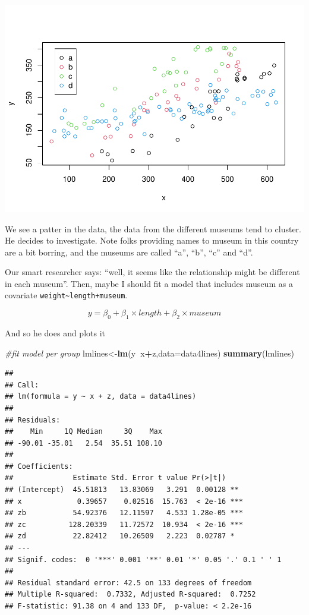 \documentclass[
]{book}
\newenvironment{Shaded}{\begin{snugshade}}{\end{snugshade}}
\newcommand{\CommentTok}[1]{\textcolor[rgb]{0.56,0.35,0.01}{\textit{#1}}}
\newcommand{\DataTypeTok}[1]{\textcolor[rgb]{0.13,0.29,0.53}{#1}}
\newcommand{\KeywordTok}[1]{\textcolor[rgb]{0.13,0.29,0.53}{\textbf{#1}}}
\newcommand{\NormalTok}[1]{#1}
\newcommand{\OperatorTok}[1]{\textcolor[rgb]{0.81,0.36,0.00}{\textbf{#1}}}
\begin{document}
\includegraphics{ECOMODbook_files/figure-latex/a7.11-1.pdf}

We see a patter in the data, the data from the different museums tend to cluster. He decides to investigate. Note folks providing names to museum in this country are a bit borring, and the museums are called ``a'', ``b'', ``c'' and ``d''.

Our smart researcher says: ``well, it seems like the relationship might be different in each museum''. Then, maybe I should fit a model that includes museum as a covariate \texttt{weight\textasciitilde{}length+museum}.

\[y=\beta_0+\beta_1 \times length +\beta_2 \times museum\]

And so he does and plots it

\begin{Shaded}
\begin{Highlighting}[]
\CommentTok{#fit model per group}
\NormalTok{lmlines<-}\KeywordTok{lm}\NormalTok{(y}\OperatorTok{~}\NormalTok{x}\OperatorTok{+}\NormalTok{z,}\DataTypeTok{data=}\NormalTok{data4lines)}
\KeywordTok{summary}\NormalTok{(lmlines)}
\end{Highlighting}
\end{Shaded}

\begin{verbatim}
## 
## Call:
## lm(formula = y ~ x + z, data = data4lines)
## 
## Residuals:
##    Min     1Q Median     3Q    Max 
## -90.01 -35.01   2.54  35.51 108.10 
## 
## Coefficients:
##              Estimate Std. Error t value Pr(>|t|)    
## (Intercept)  45.51813   13.83069   3.291  0.00128 ** 
## x             0.39657    0.02516  15.763  < 2e-16 ***
## zb           54.92376   12.11597   4.533 1.28e-05 ***
## zc          128.20339   11.72572  10.934  < 2e-16 ***
## zd           22.82412   10.26509   2.223  0.02787 *  
## ---
## Signif. codes:  0 '***' 0.001 '**' 0.01 '*' 0.05 '.' 0.1 ' ' 1
## 
## Residual standard error: 42.5 on 133 degrees of freedom
## Multiple R-squared:  0.7332,	Adjusted R-squared:  0.7252 
## F-statistic: 91.38 on 4 and 133 DF,  p-value: < 2.2e-16
\end{verbatim}
\end{document}
